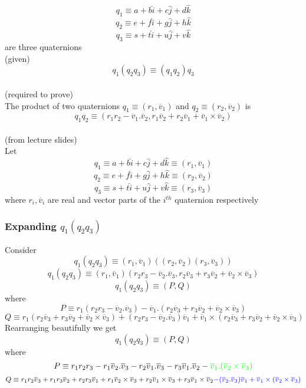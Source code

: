 \documentclass[12pt]{article}
\newcommand{\fromlectures}{{\\ \color{blue} \hspace*{\fill}(from lecture slides)} \\}
\newcommand{\given}{{\\ \color{blue} \hspace*{\fill}(given)} \\}
\newcommand{\rtp}{{\\ \color{blue} \hspace*{\fill}(required to prove)} \\}
\newcommand{\vv}[1]{\overline{v}_{#1}}
\begin{document}
\section{}
\[
  q_1 \equiv a + b \hat{i} + c \hat{j} + d \hat{k}
\]
\[
  q_2 \equiv e + f \hat{i} + g \hat{j} + h \hat{k}
\]
\[
  q_3 \equiv s + t \hat{i} + u \hat{j} + v \hat{k}
\]
are three quaternions
\given

\[
  q_1(q_2q_3) \equiv (q_1q_2)q_3
\]
\rtp

The product of two quaternions $ q_1 \equiv (r_1, \vv{1}) $ and $ q_2 \equiv (r_2, \vv{2}) $ is
\[
  q_1q_2 \equiv (r_1 r_2 - \vv{1} . \vv{2}, r_1 \vv{2} + r_2 \vv{1} + \vv{1}\times\vv{2})
\]
\fromlectures

Let
\[
  q_1 \equiv a + b \hat{i} + c \hat{j} + d \hat{k} \equiv (r_1, \vv{1})
\]
\[
  q_2 \equiv e + f \hat{i} + g \hat{j} + h \hat{k} \equiv (r_2, \vv{2})
\]
\[
  q_3 \equiv s + t \hat{i} + u \hat{j} + v \hat{k} \equiv (r_3, \vv{3})
\]
where $r_i, \vv{i}$ are real and vector parts of the $i^{th}$ quaternion respectively

\subsubsection*{Expanding $q_1(q_2q_3)$}
Consider
\[
  q_1(q_2q_3) \equiv (r_1, \vv{1}) ((r_2, \vv{2})(r_3, \vv{3}))
\]
\[
  q_1(q_2q_3) \equiv (r_1, \vv{1}) (r_2r_3 - \vv{2}.\vv{3}, r_2 \vv{3} + r_3 \vv{2} + \vv{2}\times\vv{3})
\]
\[
  q_1(q_2q_3) \equiv (P, Q)
\]
where
\[
  P \equiv r_1(r_2r_3 - \vv{2}.\vv{3}) - \vv{1}.(r_2 \vv{3} + r_3 \vv{2} + \vv{2}\times\vv{3})
\]
\[
  Q \equiv  r_1(r_2 \vv{3} + r_3 \vv{2} + \vv{2}\times\vv{3})
    + (r_2r_3 - \vv{2}.\vv{3})\vv{1}
    + \vv{1} \times (r_2 \vv{3} + r_3 \vv{2} + \vv{2}\times\vv{3})
\]
Rearranging beautifully we get
\[
  q_1(q_2q_3) \equiv (P, Q)
\]
where
\[
  P \equiv r_1r_2r_3 - r_1\vv{2}.\vv{3} - r_2\vv{1}.\vv{3} - r_3\vv{1}.\vv{2} - {\color{green} \vv{1} . (\vv{2}\times\vv{3})}
\]
\[
  Q \equiv
  r_1r_2\vv{3}
  + r_1r_3\vv{2}
  + r_2r_3\vv{1}
  + r_1 \vv{2}\times\vv{3}
  + r_2 \vv{1}\times\vv{3}
  + r_3 \vv{1}\times\vv{2}
  {\color{blue}
  - (\vv{2}.\vv{3})\vv{1}
  + \vv{1} \times (\vv{2}\times\vv{3})}
\]
\end{document}
